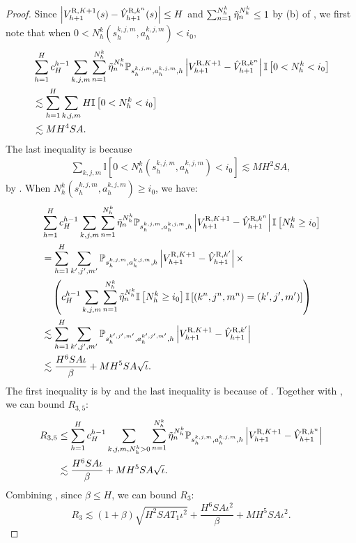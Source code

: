 \documentclass{article}
\newcommand{\R}{\textnormal{R}}
\begin{document}
\begin{proof}
Since $\left|V_{h+1}^{\R,K+1}(s)-\hat{V}_{h+1}^{\R,k^n}(s)\right| \leq H$ and $\sum_{n=1}^{N_h^k} \Tilde{\eta}_n^{N_h^k} \leq 1$ by (b) of , we first note that when $0 < N_h^k(s_h^{k,j,m}, a_h^{k,j,m}) < i_0$,
\begin{align}
\label{exchangePbeginsmall}
    &\sum_{h=1}^H c_H^{h-1}\sum_{k,j,m}\sum_{n=1}^{N_h^k} \Tilde{\eta}_n^{N_h^k}\mathbb{P}_{s_h^{k,j,m}, a_h^{k,j,m},h}\left|V_{h+1}^{\R,K+1}-\hat{V}_{h+1}^{\R,k^n}\right|\mathbb{I}\left[0<N_h^k< i_0\right]\nonumber\\
    &\lesssim \sum_{h=1}^H \sum_{k,j,m}H\mathbb{I}\left[0<N_h^k< i_0\right] \nonumber\\
    &\lesssim MH^4SA.
\end{align}
The last inequality is because
\begin{align}
    \label{sumNi0}
    \sum_{k,j,m}\mathbb{I}\left[0<N_h^k(s_h^{k,j,m}, a_h^{k,j,m})< i_0\right]  \lesssim MH^2SA,
\end{align}
by . When $N_h^k(s_h^{k,j,m}, a_h^{k,j,m}) \geq i_0$, we have:
\begin{align}
\label{exchangePbegin}
&\sum_{h=1}^H c_H^{h-1}\sum_{k,j,m}\sum_{n=1}^{N_h^k} \Tilde{\eta}_n^{N_h^k}\mathbb{P}_{s_h^{k,j,m}, a_h^{k,j,m},h}\left|V_{h+1}^{\R,K+1}-\hat{V}_{h+1}^{\R,k^n}\right|\mathbb{I}\left[N_h^k \geq i_0\right]\nonumber\\
&= \sum_{h=1}^H\sum_{k',j',m'}\mathbb{P}_{s_h^{k,j,m}, a_h^{k,j,m},h}\left|V_{h+1}^{\R,K+1}-\hat{V}_{h+1}^{\R,k'}\right| \times \nonumber\\
&\quad \left(c_H^{h-1}\sum_{k,j,m}\sum_{n=1}^{N_h^k}\Tilde{\eta}_n^{N_h^k}\mathbb{I}\left[N_h^k\geq i_0\right]\mathbb{I}\left[(k^n,j^n,m^n) = (k',j',m')\right]\right) \nonumber\\
&\lesssim \sum_{h=1}^H\sum_{k',j',m'}\mathbb{P}_{s_h^{k',j',m'}, a_h^{k',j',m'},h}\left|V_{h+1}^{\R,K+1}-\hat{V}_{h+1}^{\R,k'}\right| \nonumber\\
&\lesssim \frac{H^6SA\iota}{\beta}+ MH^5SA\sqrt{\iota}.
\end{align}
The first inequality is by  and the last inequality is because of . Together with , we can bound $R_{3,5}$:
\begin{align}
    \label{r35}
    R_{3,5} &\leq \sum_{h=1}^H c_H^{h-1}\sum_{k,j,m,N_h^k >0}\sum_{n=1}^{N_h^k} \Tilde{\eta}_n^{N_h^k}\mathbb{P}_{s_h^{k,j,m}, a_h^{k,j,m},h}\left|V_{h+1}^{\R,K+1}-\hat{V}_{h+1}^{\R,k^n}\right| \nonumber\\
    &\lesssim \frac{H^6SA\iota}{\beta}+ MH^5SA\sqrt{\iota}.
\end{align}
Combining , since $\beta \leq H$, we can bound $R_3$:
$$R_3 \lesssim (1+\beta) \sqrt{H^2SAT_1\iota^2} +\frac{H^6SA\iota^2}{\beta}+ MH^5SA\iota^2.$$
\end{proof}
\end{document}
